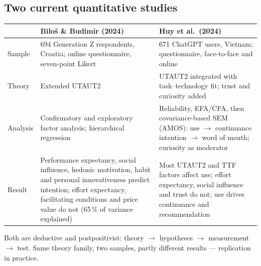 \documentclass[11pt,a4paper,british,twoside=false,headings=small,chapterprefix=false,numbers=noenddot]{scrbook}
\begin{document}
\subsection{Two current quantitative studies}
\begin{center}\small
\footnotesize
  \renewcommand{\arraystretch}{1.2}
  \begin{tabular}{@{}p{2.2cm}p{5.2cm}p{5.8cm}@{}}
    \toprule
    & \textbf{Bilo\v{s} \& Budimir (2024)} & \textbf{Huy et al.\ (2024)}\\
    \midrule
    Sample & 694 Generation Z respondents, Croatia; online questionnaire, seven-point Likert & 671 ChatGPT users, Vietnam; questionnaire, face-to-face and online\\
    Theory & Extended UTAUT2 & UTAUT2 integrated with task--technology fit; trust and curiosity added\\
    Analysis & Confirmatory and exploratory factor analysis; hierarchical regression & Reliability, EFA/CFA, then covariance-based SEM (AMOS): use $\rightarrow$ continuance intention $\rightarrow$ word of mouth; curiosity as moderator\\
    Result & Performance expectancy, social influence, hedonic motivation, habit and personal innovativeness predict intention; effort expectancy, facilitating conditions and price value do not (65\,\% of variance explained) & Most UTAUT2 and TTF factors affect use; effort expectancy, social influence and trust do not; use drives continuance and recommendation\\
    \bottomrule
  \end{tabular}
  

  \small Both are deductive and postpositivist: theory $\rightarrow$
  hypotheses $\rightarrow$ measurement $\rightarrow$ test. Same theory family,
  two samples, partly different results --- replication in practice.
\end{center}
\end{document}
